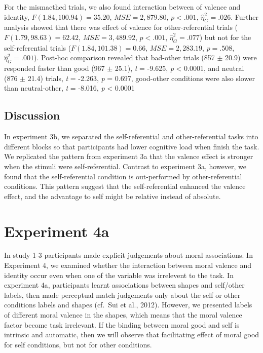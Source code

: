 \documentclass[man]{apa6}
\begin{document}
For the mismacthed trials, we also found interaction between of valence and identity, \(F(1.84, 100.94) = 35.20\), \(\mathit{MSE} = 2,879.80\), \(p < .001\), \(\hat{\eta}^2_G = .026\). Further analysis showed that there was effect of valence for other-referential trials (\(F(1.79, 98.63) = 62.42\), \(\mathit{MSE} = 3,489.92\), \(p < .001\), \(\hat{\eta}^2_G = .077\)) but not for the self-referential trials (\(F(1.84, 101.38) = 0.66\), \(\mathit{MSE} = 2,283.19\), \(p = .508\), \(\hat{\eta}^2_G = .001\)). Post-hoc comparison revealed that bad-other trials (857 \(\pm\) 20.9) were responded faster than good (967 \(\pm\) 25.1), \emph{t} = -9.625, \emph{p} \textless{} 0.0001, and neutral (876 \(\pm\) 21.4) trials, \emph{t} = -2.263, \emph{p} = 0.697, good-other conditions were also slower than neutral-other, \emph{t} = -8.016, \emph{p} \textless{} 0.0001

\hypertarget{discussion-3}{%
\subsection{Discussion}\label{discussion-3}}

In experiment 3b, we separated the self-referential and other-referential tasks into different blocks so that participants had lower cognitive load when finish the task. We replicated the pattern from experiment 3a that the valence effect is stronger when the stimuli were self-referential. Contrast to experiment 3a, however, we found that the self-referential condition is out-performed by other-referential conditions. This pattern suggest that the self-referential enhanced the valence effect, and the advantage to self might be relative instead of absolute.

\hypertarget{experiment-4a}{%
\section{Experiment 4a}\label{experiment-4a}}

In study 1-3 participants made explicit judgements about moral associations. In Experiment 4, we examined whether the interaction between moral valence and identity occur even when one of the variable was irrelevent to the task. In experiment 4a, participants learnt associations between shapes and self/other labels, then made perceptual match judgements only about the self or other conditions labels and shapes (cf.~Sui et al., 2012). However, we presented labels of different moral valence in the shapes, which means that the moral valence factor become task irrelevant. If the binding between moral good and self is intrinsic and automatic, then we will observe that facilitating effect of moral good for self conditions, but not for other conditions.
\end{document}
